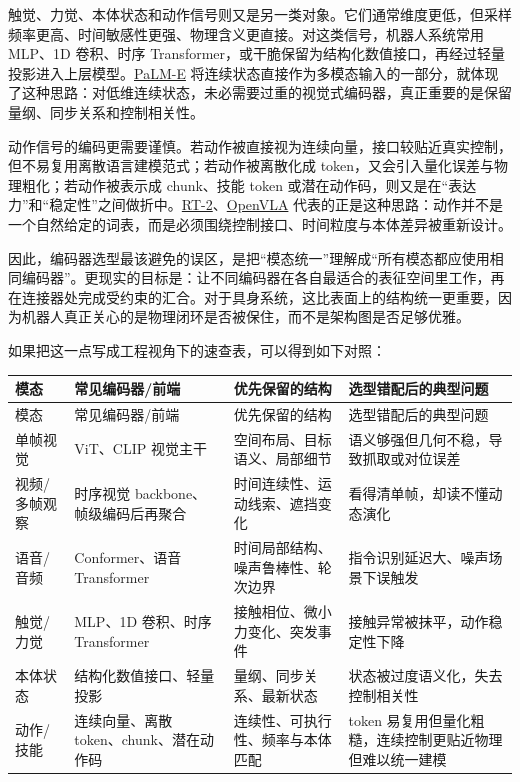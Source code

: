触觉、力觉、本体状态和动作信号则又是另一类对象。它们通常维度更低，但采样频率更高、时间敏感性更强、物理含义更直接。对这类信号，机器人系统常用 MLP、1D 卷积、时序 Transformer，或干脆保留为结构化数值接口，再经过轻量投影进入上层模型。\href{https://arxiv.org/abs/2303.03378}{PaLM-E} 将连续状态直接作为多模态输入的一部分，就体现了这种思路：对低维连续状态，未必需要过重的视觉式编码器，真正重要的是保留量纲、同步关系和控制相关性。

动作信号的编码更需要谨慎。若动作被直接视为连续向量，接口较贴近真实控制，但不易复用离散语言建模范式；若动作被离散化成 token，又会引入量化误差与物理粗化；若动作被表示成 chunk、技能 token 或潜在动作码，则又是在“表达力”和“稳定性”之间做折中。\href{https://arxiv.org/abs/2307.15818}{RT-2}、\href{https://arxiv.org/abs/2406.09246}{OpenVLA} 代表的正是这种思路：动作并不是一个自然给定的词表，而是必须围绕控制接口、时间粒度与本体差异被重新设计。

因此，编码器选型最该避免的误区，是把“模态统一”理解成“所有模态都应使用相同编码器”。更现实的目标是：让不同编码器在各自最适合的表征空间里工作，再在连接器处完成受约束的汇合。对于具身系统，这比表面上的结构统一更重要，因为机器人真正关心的是物理闭环是否被保住，而不是架构图是否足够优雅。

如果把这一点写成工程视角下的速查表，可以得到如下对照：

\begingroup
\small
\begin{xltabular}{\textwidth}{YYYY}
\toprule
模态 & 常见编码器/前端 & 优先保留的结构 & 选型错配后的典型问题 \\
\midrule
\endfirsthead
\toprule
模态 & 常见编码器/前端 & 优先保留的结构 & 选型错配后的典型问题 \\
\midrule
\endhead
单帧视觉 & ViT、CLIP 视觉主干 & 空间布局、目标语义、局部细节 & 语义够强但几何不稳，导致抓取或对位误差 \\
视频/多帧观察 & 时序视觉 backbone、帧级编码后再聚合 & 时间连续性、运动线索、遮挡变化 & 看得清单帧，却读不懂动态演化 \\
语音/音频 & Conformer、语音 Transformer & 时间局部结构、噪声鲁棒性、轮次边界 & 指令识别延迟大、噪声场景下误触发 \\
触觉/力觉 & MLP、1D 卷积、时序 Transformer & 接触相位、微小力变化、突发事件 & 接触异常被抹平，动作稳定性下降 \\
本体状态 & 结构化数值接口、轻量投影 & 量纲、同步关系、最新状态 & 状态被过度语义化，失去控制相关性 \\
动作/技能 & 连续向量、离散 token、chunk、潜在动作码 & 连续性、可执行性、频率与本体匹配 & token 易复用但量化粗糙，连续控制更贴近物理但难以统一建模 \\
\bottomrule
\end{xltabular}
\endgroup

